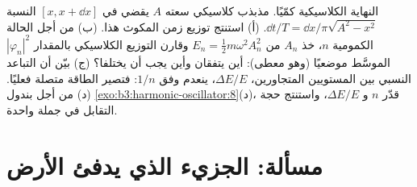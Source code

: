 \begin{exercise}[$\star\star\star$]\label{exo:b3:harmonic-oscillator:12}
النهاية الكلاسيكية كمّيًا. مذبذب كلاسيكي سعته
$A$ يقضي في $[x, x + \dd x]$ النسبة $\dd
t/T = \dd x/\pi\sqrt{A^2 - x^2}$. (أ) استنتج توزيع زمن
المكوث هذا. (ب) من أجل الحالة الكمومية $n$، خذ $A_n$ من $E_n =
\tfrac12 m\omega^2A_n^2$ وقارن التوزيع الكلاسيكي
بالمقدار $|\varphi_n|^2$ الموسَّط موضعيًا (وهو معطى): أين يتفقان
وأين يجب أن يختلفا؟ (ج) بيّن أن التباعد النسبي بين
المستويين المتجاورين، $\Delta E/E$، ينعدم وفق $1/n$: فتصير الطاقة
متصلة فعليًا. (د) من أجل بندول
\cref{exo:b3:harmonic-oscillator:8}(د)، قدّر $n$ و $\Delta
E/E$، واستنتج حجة التقابل في جملة واحدة.
\end{exercise}

\section{مسألة: الجزيء الذي يدفئ الأرض}

